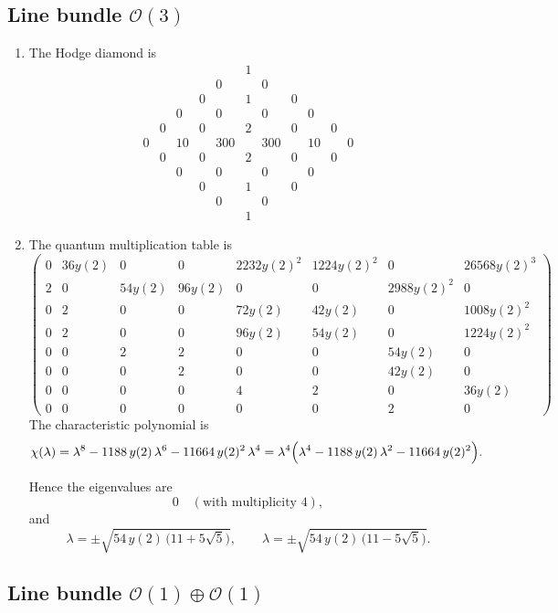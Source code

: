 \documentclass[11pt]{amsart}
\newcounter{num}[section] %
\begin{document}
\subsection{Line bundle $\mathcal{O}(3)$}
\begin{enumerate}
    \item [1)] The Hodge diamond is
    \[
\begin{array}{ccccccccccc}
 &&&&&1&&&&&\\
 &&&&0&&0&&&&\\
 &&&0&&1&&0&&&\\
 &&0&&0&&0&&0&&\\
 &0&&0&&2&&0&&0&\\
0&&10&&300&&300&&10&&0\\
 &0&&0&&2&&0&&0&\\
 &&0&&0&&0&&0&&\\
 &&&0&&1&&0&&&\\
 &&&&0&&0&&&&\\
 &&&&&1&&&&&
\end{array}
\]

\item[2)] The quantum multiplication table is 
\[
\begin{pmatrix}
0 & 36y(2) & 0 & 0 & 2232y(2)^2 & 1224y(2)^2 & 0 & 26568y(2)^3 \\
2 & 0 & 54y(2) & 96y(2) & 0 & 0 & 2988y(2)^2 & 0 \\
0 & 2 & 0 & 0 & 72y(2) & 42y(2) & 0 & 1008y(2)^2 \\
0 & 2 & 0 & 0 & 96y(2) & 54y(2) & 0 & 1224y(2)^2 \\
0 & 0 & 2 & 2 & 0 & 0 & 54y(2) & 0 \\
0 & 0 & 0 & 2 & 0 & 0 & 42y(2) & 0 \\
0 & 0 & 0 & 0 & 4 & 2 & 0 & 36y(2) \\
0 & 0 & 0 & 0 & 0 & 0 & 2 & 0
\end{pmatrix}
\]
The characteristic polynomial is
\[
\chi(\lambda)=\lambda^8-1188\,y(2)\,\lambda^6-11664\,y(2)^2\,\lambda^4
=\lambda^4\Bigl(\lambda^4-1188\,y(2)\,\lambda^2-11664\,y(2)^2\Bigr).
\]

Hence the eigenvalues are
\[
0 \quad (\text{with multiplicity }4),
\]
and
\[
\lambda=\pm \sqrt{54\,y(2)\,\bigl(11+5\sqrt5\bigr)},\qquad
\lambda=\pm \sqrt{54\,y(2)\,\bigl(11-5\sqrt5\bigr)}.
\]
\end{enumerate}
\subsection{Line bundle $\mathcal{O}(1) \oplus \mathcal{O}(1)$}
\end{document}
